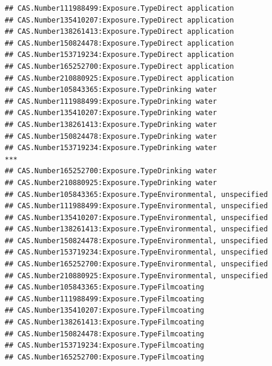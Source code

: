 \documentclass[
  12pt,
]{article}
\begin{document}
\begin{verbatim}
## CAS.Number111988499:Exposure.TypeDirect application                                
## CAS.Number135410207:Exposure.TypeDirect application                                
## CAS.Number138261413:Exposure.TypeDirect application                                
## CAS.Number150824478:Exposure.TypeDirect application                                
## CAS.Number153719234:Exposure.TypeDirect application                                
## CAS.Number165252700:Exposure.TypeDirect application                                
## CAS.Number210880925:Exposure.TypeDirect application                                
## CAS.Number105843365:Exposure.TypeDrinking water                                    
## CAS.Number111988499:Exposure.TypeDrinking water                                    
## CAS.Number135410207:Exposure.TypeDrinking water                                    
## CAS.Number138261413:Exposure.TypeDrinking water                                    
## CAS.Number150824478:Exposure.TypeDrinking water                                    
## CAS.Number153719234:Exposure.TypeDrinking water                                 ***
## CAS.Number165252700:Exposure.TypeDrinking water                                    
## CAS.Number210880925:Exposure.TypeDrinking water                                    
## CAS.Number105843365:Exposure.TypeEnvironmental, unspecified                        
## CAS.Number111988499:Exposure.TypeEnvironmental, unspecified                        
## CAS.Number135410207:Exposure.TypeEnvironmental, unspecified                        
## CAS.Number138261413:Exposure.TypeEnvironmental, unspecified                        
## CAS.Number150824478:Exposure.TypeEnvironmental, unspecified                        
## CAS.Number153719234:Exposure.TypeEnvironmental, unspecified                        
## CAS.Number165252700:Exposure.TypeEnvironmental, unspecified                        
## CAS.Number210880925:Exposure.TypeEnvironmental, unspecified                        
## CAS.Number105843365:Exposure.TypeFilmcoating                                       
## CAS.Number111988499:Exposure.TypeFilmcoating                                       
## CAS.Number135410207:Exposure.TypeFilmcoating                                       
## CAS.Number138261413:Exposure.TypeFilmcoating                                       
## CAS.Number150824478:Exposure.TypeFilmcoating                                       
## CAS.Number153719234:Exposure.TypeFilmcoating                                       
## CAS.Number165252700:Exposure.TypeFilmcoating                                       

\end{verbatim}
\end{document}
